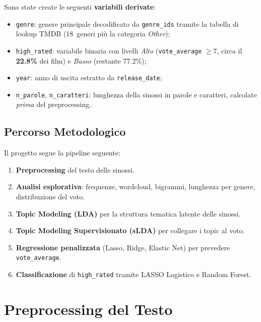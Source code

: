 \documentclass[12pt, a4paper]{article}
\newcommand{\code}[1]{\texttt{#1}}
\begin{document}
Sono state create le seguenti \textbf{variabili derivate}:

\begin{itemize}[leftmargin=1.8em]
  \item \code{genre}: genere principale decodificato da
        \code{genre\_ids} tramite la tabella di lookup TMDB
        (18~generi più la categoria \textit{Other});
  \item \code{high\_rated}: variabile binaria con livelli
        \textit{Alto} (\code{vote\_average} $\geq 7$,
        circa il \textbf{22.8\%} dei film) e \textit{Basso}
        (restante 77.2\%);
  \item \code{year}: anno di uscita estratto da
        \code{release\_date};
  \item \code{n\_parole}, \code{n\_caratteri}: lunghezza
        della sinossi in parole e caratteri, calcolate
        \emph{prima} del preprocessing.
\end{itemize}

\subsection{Percorso Metodologico}

Il progetto segue la pipeline seguente:

\begin{enumerate}[leftmargin=1.8em]
  \item \textbf{Preprocessing} del testo delle sinossi.
  \item \textbf{Analisi esplorativa}: frequenze, wordcloud,
        bigrammi, lunghezza per genere, distribuzione del voto.
  \item \textbf{Topic Modeling (LDA)} per la struttura tematica
        latente delle sinossi.
  \item \textbf{Topic Modeling Supervisionato (sLDA)} per
        collegare i topic al voto.
  \item \textbf{Regressione penalizzata} (Lasso, Ridge,
        Elastic Net) per prevedere \code{vote\_average}.
  \item \textbf{Classificazione} di \code{high\_rated} tramite
        LASSO Logistico e Random Forest.
\end{enumerate}


\section{Preprocessing del Testo}
\end{document}

